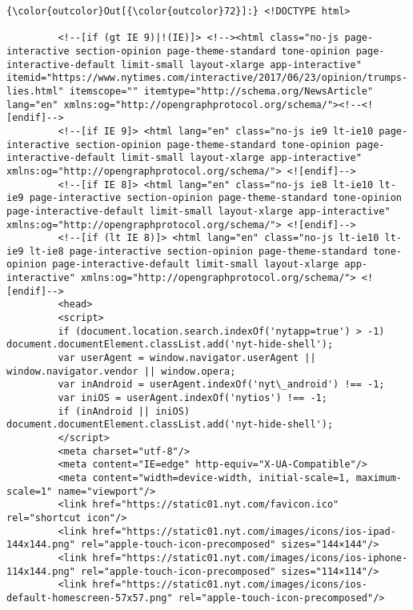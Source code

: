 \documentclass[11pt]{article}
\begin{document}
\begin{Verbatim}[commandchars=\\\{\}]
{\color{outcolor}Out[{\color{outcolor}72}]:} <!DOCTYPE html>
         
         <!--[if (gt IE 9)|!(IE)]> <!--><html class="no-js page-interactive section-opinion page-theme-standard tone-opinion page-interactive-default limit-small layout-xlarge app-interactive" itemid="https://www.nytimes.com/interactive/2017/06/23/opinion/trumps-lies.html" itemscope="" itemtype="http://schema.org/NewsArticle" lang="en" xmlns:og="http://opengraphprotocol.org/schema/"><!--<![endif]-->
         <!--[if IE 9]> <html lang="en" class="no-js ie9 lt-ie10 page-interactive section-opinion page-theme-standard tone-opinion page-interactive-default limit-small layout-xlarge app-interactive" xmlns:og="http://opengraphprotocol.org/schema/"> <![endif]-->
         <!--[if IE 8]> <html lang="en" class="no-js ie8 lt-ie10 lt-ie9 page-interactive section-opinion page-theme-standard tone-opinion page-interactive-default limit-small layout-xlarge app-interactive" xmlns:og="http://opengraphprotocol.org/schema/"> <![endif]-->
         <!--[if (lt IE 8)]> <html lang="en" class="no-js lt-ie10 lt-ie9 lt-ie8 page-interactive section-opinion page-theme-standard tone-opinion page-interactive-default limit-small layout-xlarge app-interactive" xmlns:og="http://opengraphprotocol.org/schema/"> <![endif]-->
         <head>
         <script>
         if (document.location.search.indexOf('nytapp=true') > -1) document.documentElement.classList.add('nyt-hide-shell');
         var userAgent = window.navigator.userAgent || window.navigator.vendor || window.opera;
         var inAndroid = userAgent.indexOf('nyt\_android') !== -1;
         var iniOS = userAgent.indexOf('nytios') !== -1;
         if (inAndroid || iniOS) document.documentElement.classList.add('nyt-hide-shell');
         </script>
         <meta charset="utf-8"/>
         <meta content="IE=edge" http-equiv="X-UA-Compatible"/>
         <meta content="width=device-width, initial-scale=1, maximum-scale=1" name="viewport"/>
         <link href="https://static01.nyt.com/favicon.ico" rel="shortcut icon"/>
         <link href="https://static01.nyt.com/images/icons/ios-ipad-144x144.png" rel="apple-touch-icon-precomposed" sizes="144×144"/>
         <link href="https://static01.nyt.com/images/icons/ios-iphone-114x144.png" rel="apple-touch-icon-precomposed" sizes="114×114"/>
         <link href="https://static01.nyt.com/images/icons/ios-default-homescreen-57x57.png" rel="apple-touch-icon-precomposed"/>

\end{Verbatim}
\end{document}
